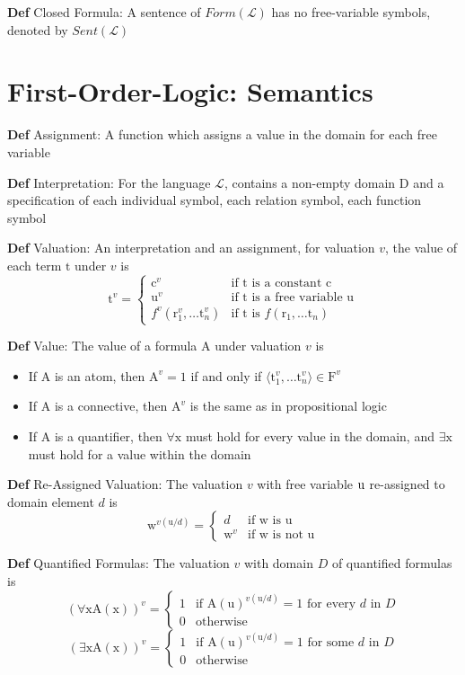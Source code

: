 \documentclass[11pt,notitlepage]{report}
\newcommand{\mc}[1]{\ensuremath{\mathcal{#1}}}
\newcommand{\mr}[1]{\ensuremath{\mathrm{#1}}}
\newcommand{\tbf}[1]{\textbf{#1}}
\begin{document}
\tbf{Def} Closed Formula: A sentence of $Form(\mc L)$ has no free-variable symbols, denoted by $Sent(\mc L)$

\newpage
\section{First-Order-Logic: Semantics}

\tbf{Def} Assignment: A function which assigns a value in the domain for each free variable

\tbf{Def} Interpretation: For the language $\mc L$, contains a non-empty domain $\mr D$ and a specification of each individual symbol, each relation symbol, each function symbol

\tbf{Def} Valuation: An interpretation and an assignment, for valuation $v$, the value of each term $\mr t$ under $v$ is
$$\mr t^v = \begin{cases}
\mr c^v & \text{if $\mr t$ is a constant $\mr c$}\\
\mr u^v & \text{if $\mr t$ is a free variable $\mr u$}\\
f^v (\mr r_1^v, \dots \mr t_n^v) & \text{if $\mr t$ is $f (\mr r_1, \dots \mr t_n)$}
\end{cases}$$

\tbf{Def} Value: The value of a formula $\mr A$ under valuation $v$ is
\begin{itemize}
    \item If $\mr A$ is an atom, then $\mr A^v = 1$ if and only if $\langle \mr t_1^v, \dots \mr t_n^v\rangle \in \mr F^v$
    \item If $\mr A$ is a connective, then $\mr A^v$ is the same as in propositional logic
    \item If $\mr A$ is a quantifier, then $\forall \mr x$ must hold for every value in the domain, and $\exists \mr x$ must hold for a value within the domain
\end{itemize}

\tbf{Def} Re-Assigned Valuation: The valuation $v$ with free variable $\rm u$ re-assigned to domain element $d$ is
$$\mr w^{v(\mr u / d)} = \begin{cases}d & \text{if $\mr w$ is $\mr u$}\\
\mr w^v & \text{if $\mr w$ is not $\mr u$}\end{cases}$$

\tbf{Def} Quantified Formulas: The valuation $v$ with domain $D$ of quantified formulas is
$$(\forall \mr x \mr A(\mr x))^v = \begin{cases}1&\text{if $\mr A(\mr u)^{v(\mr u/d)} = 1$ for every $d$ in $D$}\\
0 & \text{otherwise}\end{cases}$$
$$(\exists \mr x \mr A(\mr x))^v = \begin{cases}1&\text{if $\mr A(\mr u)^{v(\mr u/d)} = 1$ for some $d$ in $D$}\\
0 & \text{otherwise}\end{cases}$$
\end{document}
